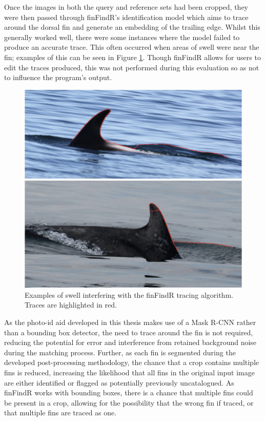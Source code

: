 Once the images in both the query and reference sets had been cropped, they were then passed through finFindR's identification model which aims to trace around the dorsal fin and generate an embedding of the trailing edge. Whilst this generally worked well, there were some instances where the model failed to produce an accurate trace. This often occurred when areas of swell were near the fin; examples of this can be seen in Figure \ref{fig:finFindR-bad-traces}. Though finFindR allows for users to edit the traces produced, this was not performed during this evaluation so as not to influence the program's output.

\begin{figure}
	\begin{center}
		\includegraphics[scale=0.5]{Chapter7/figs/ffr-bad-traces.png}
	\end{center}
	\caption[Examples of swell interfering with the finFindR tracing algorithm.]{Examples of swell interfering with the finFindR tracing algorithm. Traces are highlighted in red.}
	\label{fig:finFindR-bad-traces}
\end{figure} 

As the photo-id aid developed in this thesis makes use of a Mask R-CNN rather than a bounding box detector, the need to trace around the fin is not required, reducing the potential for error and interference from retained background noise during the matching process. Further, as each fin is segmented during the developed post-processing methodology, the chance that a crop contains multiple fins is reduced, increasing the likelihood that all fins in the original input image are either identified or flagged as potentially previously uncatalogued. As finFindR works with bounding boxes, there is a chance that multiple fins could be present in a crop, allowing for the possibility that the wrong fin if traced, or that multiple fins are traced as one. 

